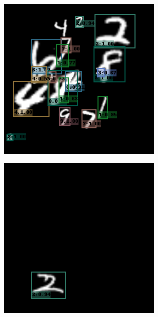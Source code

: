 \begin{figure}[h!]
\begin{subfigure}[b]{0.193\textwidth}
    \end{subfigure}
    \hfill
    \begin{subfigure}[b]{0.193\textwidth}
        \centering
        \includegraphics[width=\textwidth]{Images/mnist_output/4.png}
    \end{subfigure}
    \hfill
    \begin{subfigure}[b]{0.193\textwidth}
        \centering
        \includegraphics[width=\textwidth]{Images/mnist_output/5.png}

\end{subfigure}
\end{figure}
